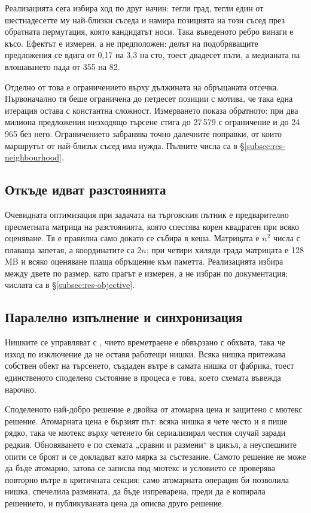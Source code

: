 Реализацията сега избира ход по друг начин: тегли град, тегли един от шестнадесетте
му най-близки съседа и намира позицията на този съсед през обратната пермутация,
която кандидатът носи. Така въведеното ребро винаги е късо. Ефектът е измерен, а не
предположен: делът на подобряващите предложения се вдига от 0,17 на 3,3 на сто, тоест
двадесет пъти, а медианата на влошаването пада от 355 на 82.

Отделно от това е ограничението върху дължината на обръщаната отсечка. Първоначално
тя беше ограничена до петдесет позиции с мотива, че така една итерация остава с
константна сложност. Измерването показа обратното: при два милиона предложения
низходящо търсене стига до 27\,579 с ограничение и до 24\,965 без него. Ограничението
забранява точно далечните поправки, от които маршрутът от най-близък съсед има нужда.
Пълните числа са в §\ref{subsec:res-neighbourhood}.

\subsection{Откъде идват разстоянията}
\label{subsec:impl-distance}

Очевидната оптимизация при задачата на търговския пътник е предварително пресметната
матрица на разстоянията, която спестява корен квадратен при всяко оценяване. Тя е
правилна само докато се събира в кеша. Матрицата е $n^2$ числа с плаваща запетая, а
координатите са $2n$; при четири хиляди града матрицата е 128 MB и всяко оценяване
плаща обръщение към паметта. Реализацията избира между двете по размер, като прагът е
измерен, а не избран по документация; числата са в §\ref{subsec:res-objective}.

\subsection{Паралелно изпълнение и синхронизация}
\label{subsec:impl-threads}

Нишките се управляват с , чието времетраене е обвързано с обхвата,
така че изход по изключение да не оставя работещи нишки. Всяка нишка притежава
собствен обект на търсенето, създаден вътре в самата нишка от фабрика, тоест
единственото споделено състояние в процеса е това, което схемата въвежда нарочно.

Споделеното най-добро решение е двойка от атомарна цена и защитено с мютекс решение.
Атомарната цена е бързият път: всяка нишка я чете често и я пише рядко, така че мютекс
върху четенето би сериализирал честия случай заради редкия. Обновяването е по схемата
„сравни и размени“ в цикъл, а неуспешните опити се броят и се докладват като мярка за
състезание. Самото решение не може да бъде атомарно, затова се записва под мютекс и
условието се проверява повторно вътре в критичната секция: само атомарната операция
би позволила нишка, спечелила размяната, да бъде изпреварена, преди да е копирала
решението, и публикуваната цена да описва друго решение.

